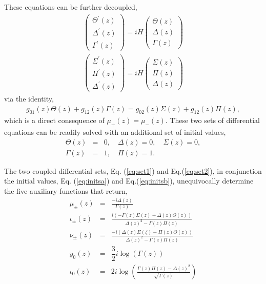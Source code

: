 \documentclass[9pt,twocolumn,twoside]{osajnl}
\begin{document}
These equations can be further decoupled,
\begin{eqnarray}
	\left( \begin{array}{c}
		\Theta^{\prime}(z) \\
	\Delta^{\prime}(z) \\
	\Gamma^{\prime}(z) 
		\end{array} \right)=iH 
		\left( \begin{array}{c}
	\Theta(z) \\
	\Delta(z) \\
		\Gamma(z) 
	\end{array} \right) \label{eq:set1}\\
	\left( \begin{array}{c}
	\Sigma^{\prime}(z) \\
	\Pi^{\prime} (z) \\
	\Delta^{\prime}(z) 
	\end{array} \right)=iH 
	\left( \begin{array}{c}
	\Sigma(z) \label{eq:set2}\\
	\Pi (z) \\
	\Delta(z)  
	\end{array} \right)
	\end{eqnarray}
via the identity, 
\begin{eqnarray}
g_{01}(z)\Theta(z) + g_{12}(z) \Gamma(z) =  g_{02}(z) \Sigma (z) + g_{12}(z) \Pi (z),
\end{eqnarray}
which is a direct consequence of $\mu_{+}(z)=\mu_{-}(z)$.
These two sets of differential equations can be readily solved with an additional set of initial values,
\begin{eqnarray}
\Theta(z)&=& 0 , \quad \Delta(z) =  0, \quad \Sigma(z)= 0,   \label{eq:initsa} \\
\Gamma(z)&=& 1, \quad \Pi(z)= 1. \label{eq:initsb}
\end{eqnarray}



The two coupled differential sets, Eq. (\ref{eq:set1}) and Eq.(\ref{eq:set2}), in conjunction the initial values, Eq. (\ref{eq:initsa}) and Eq.(\ref{eq:initsb}), 
unequivocally determine the five auxiliary functions that return, 
\begin{eqnarray}
\mu_{\pm}(z) &=& \frac{-i \Delta(z)}{\Gamma(z)} \\
\iota_{\pm}(z) &=& \frac{i(-\Gamma(z)\Sigma(z)+\Delta(z)\Theta(z))}{\Delta(z)^2-\Gamma(z)\Pi(z)}\\
\nu_{\pm}(z) &=& \frac{-i(\Delta(z)\Sigma(\zeta)-\Pi(z)\Theta(z))}{\Delta(z)^2-\Gamma(z)\Pi(z)}\\
y_0(z) &=&  \dfrac{3}{2} i \log (\Gamma(z))\label{eq:yzeto}\\
\iota_0(z) &=& 2 i \log (\frac{\Gamma(z)\Pi(z)-\Delta(z)^2}{\sqrt{\Gamma(z)}}) \label{eq:izero}
\end{eqnarray}
\end{document}
